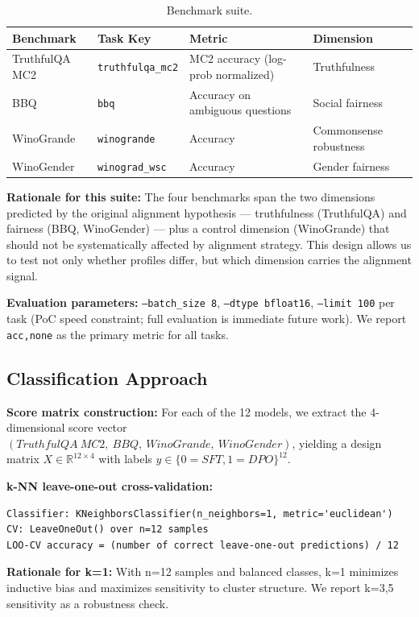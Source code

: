 \begin{table}[h]
\centering
\caption{Benchmark suite.}
\label{tab:benchmarks}
\begin{tabular}{llll}
\toprule
Benchmark & Task Key & Metric & Dimension \\
\midrule
TruthfulQA MC2 & \texttt{truthfulqa\_mc2} & MC2 accuracy (log-prob normalized) & Truthfulness \\
BBQ & \texttt{bbq} & Accuracy on ambiguous questions & Social fairness \\
WinoGrande & \texttt{winogrande} & Accuracy & Commonsense robustness \\
WinoGender & \texttt{winograd\_wsc} & Accuracy & Gender fairness \\
\bottomrule
\end{tabular}
\end{table}

\textbf{Rationale for this suite:} The four benchmarks span the two dimensions predicted by
the original alignment hypothesis --- truthfulness (TruthfulQA) and fairness (BBQ,
WinoGender) --- plus a control dimension (WinoGrande) that should not be systematically
affected by alignment strategy. This design allows us to test not only whether profiles
differ, but which dimension carries the alignment signal.

\textbf{Evaluation parameters:} \texttt{--batch\_size 8}, \texttt{--dtype bfloat16}, \texttt{--limit 100} per
task (PoC speed constraint; full evaluation is immediate future work). We report
\texttt{acc,none} as the primary metric for all tasks.

\subsection{Classification Approach}

\textbf{Score matrix construction:} For each of the 12 models, we extract the 4-dimensional
score vector $(TruthfulQA\ MC2,\ BBQ,\ WinoGrande,\ WinoGender)$, yielding a design matrix
$X \in \mathbb{R}^{12\times4}$ with labels $y \in \{0=SFT, 1=DPO\}^{12}$.

\textbf{k-NN leave-one-out cross-validation:}

\begin{verbatim}
Classifier: KNeighborsClassifier(n_neighbors=1, metric='euclidean')
CV: LeaveOneOut() over n=12 samples
LOO-CV accuracy = (number of correct leave-one-out predictions) / 12
\end{verbatim}

\textbf{Rationale for k=1:} With n=12 samples and balanced classes, k=1 minimizes inductive
bias and maximizes sensitivity to cluster structure. We report k=3,5 sensitivity as
a robustness check.

